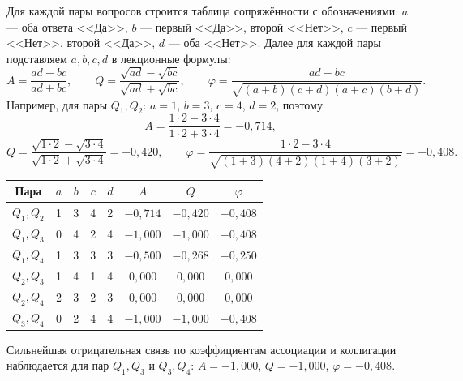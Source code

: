 Для каждой пары вопросов строится таблица сопряжённости с обозначениями:
$a$ — оба ответа <<Да>>, $b$ — первый <<Да>>, второй <<Нет>>, $c$ — первый <<Нет>>, второй <<Да>>, $d$ — оба <<Нет>>.
Далее для каждой пары подставляем $a,b,c,d$ в лекционные формулы:
\[
  A=\frac{ad-bc}{ad+bc}, \qquad
  Q=\frac{\sqrt{ad}-\sqrt{bc}}{\sqrt{ad}+\sqrt{bc}}, \qquad
  \varphi=\frac{ad-bc}{\sqrt{(a+b)(c+d)(a+c)(b+d)}}.
\]
Например, для пары $Q_1,Q_2$: $a=1$, $b=3$, $c=4$, $d=2$, поэтому
\[
  A=\frac{1\cdot2-3\cdot4}{1\cdot2+3\cdot4}=-0{,}714,
\]
\[
  Q=\frac{\sqrt{1\cdot2}-\sqrt{3\cdot4}}{\sqrt{1\cdot2}+\sqrt{3\cdot4}}=-0{,}420,
  \qquad
  \varphi=\frac{1\cdot2-3\cdot4}{\sqrt{(1+3)(4+2)(1+4)(3+2)}}=-0{,}408.
\]

\begin{center}
\small
\begin{tabular}{c|cccc|ccc}
  \hline
  Пара & $a$ & $b$ & $c$ & $d$ & $A$ & $Q$ & $\varphi$ \\
  \hline
  $Q_1,Q_2$ & 1 & 3 & 4 & 2 & $-0{,}714$ & $-0{,}420$ & $-0{,}408$ \\
  $Q_1,Q_3$ & 0 & 4 & 2 & 4 & $-1{,}000$ & $-1{,}000$ & $-0{,}408$ \\
  $Q_1,Q_4$ & 1 & 3 & 3 & 3 & $-0{,}500$ & $-0{,}268$ & $-0{,}250$ \\
  $Q_2,Q_3$ & 1 & 4 & 1 & 4 & $0{,}000$ & $0{,}000$ & $0{,}000$ \\
  $Q_2,Q_4$ & 2 & 3 & 2 & 3 & $0{,}000$ & $0{,}000$ & $0{,}000$ \\
  $Q_3,Q_4$ & 0 & 2 & 4 & 4 & $-1{,}000$ & $-1{,}000$ & $-0{,}408$ \\
  \hline
\end{tabular}
\end{center}

Сильнейшая отрицательная связь по коэффициентам ассоциации и коллигации наблюдается для пар $Q_1,Q_3$ и $Q_3,Q_4$: $A=-1{,}000$, $Q=-1{,}000$, $\varphi=-0{,}408$.

\clearpage
